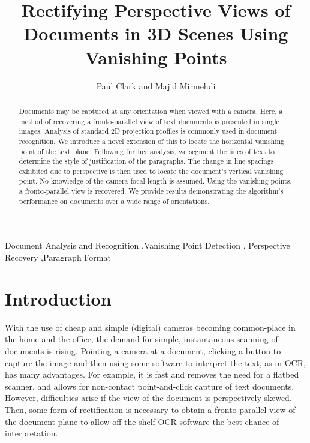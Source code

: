 \documentclass{elsart}   %
\begin{document}
\begin{frontmatter}

\title{Rectifying Perspective Views of Documents in 3D Scenes Using Vanishing Points}

\author{Paul Clark and Majid Mirmehdi}  %

\address{
Department of Computer Science, Univerity of Bristol, Bristol BS8 1UB, UK %
}

\begin{abstract}
Documents may be captured at any orientation when viewed with a camera.  Here, 
a method of recovering a fronto-parallel view of text documents is presented
in single images.
Analysis of standard 2D projection profiles is commonly used in
document recognition. We introduce a novel extension of this to locate the
horizontal vanishing point  of the text plane.  Following further analysis,
we segment the lines of text  to determine the style of
justification of the paragraphs.  The change in line spacings exhibited due to
perspective is then used to locate the document's vertical vanishing point. 
No knowledge of the camera focal length  is assumed. Using the vanishing
points, a fronto-parallel view is recovered. 
We provide results demonstrating the algorithm's performance on
documents over a wide range of orientations.
\end{abstract}

\begin{keyword}
Document Analysis and Recognition \sep Vanishing Point Detection \sep
Perspective Recovery \sep Paragraph Format
\end{keyword}
\end{frontmatter}

\small

\section{Introduction}
With the use of cheap and simple (digital) cameras becoming common-place in the 
home and the office, the demand for simple, instantaneous scanning of documents is
rising. Pointing a camera at a document, clicking a button to capture the image
and then using some software to interpret the text, as in OCR, has many
advantages. For example, it is fast and removes the need for a flatbed scanner, and allows
for non-contact point-and-click capture of text documents. However, difficulties
 arise if the view of the document is perspectively skewed. Then,
some form of rectification is necessary to obtain a fronto-parallel view of the
document plane to allow off-the-shelf OCR software the best chance of
interpretation. 
\end{document}
